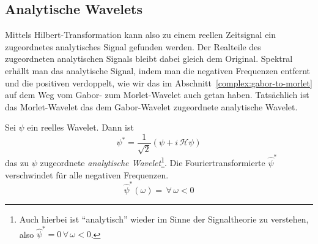 \subsection{Analytische Wavelets}

Mittels Hilbert-Transformation kann also zu einem reellen Zeitsignal ein zugeordnetes analytisches Signal gefunden werden.
Der Realteile des zugeordneten analytischen Signals bleibt dabei gleich dem Original.
Spektral erhällt man das analytische Signal, indem man die negativen Frequenzen entfernt und die positiven verdoppelt, wie wir das im Abschnitt~\ref{complex:gabor-to-morlet} auf dem Weg vom Gabor- zum Morlet-Wavelet auch getan haben.
Tatsächlich ist das Morlet-Wavelet das dem Gabor-Wavelet zugeordnete analytische Wavelet.

\begin{satz}
	\label{complex:analytic-wavelet}
	Sei $\psi$ ein reelles Wavelet. Dann ist
	\begin{equation}
		\psi^\ast = \frac{1}{\sqrt{2}}\left(\psi + i\,\mathcal{H}\psi\right)
	\end{equation}
	das zu $\psi$ zugeordnete \emph{analytische Wavelet}\footnote{Auch hierbei ist ``analytisch'' wieder im Sinne der Signaltheorie zu verstehen, also $\hat\psi^\ast = 0 \,\forall\,\omega < 0$.}.
	Die Fouriertransformierte $\hat\psi^\ast$ verschwindet für alle negativen Frequenzen.
	\[\hat\psi^\ast(\omega) = \,\forall\,\omega<0\]
\end{satz}

